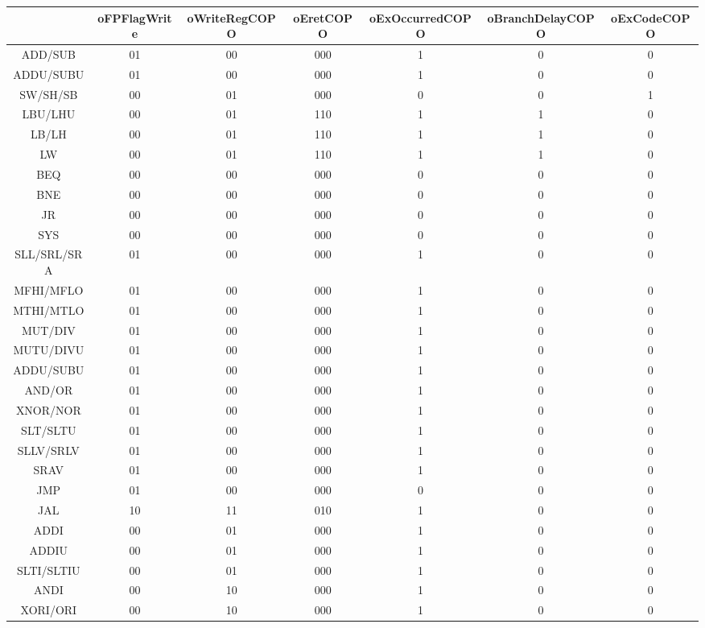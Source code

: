 \documentclass[12pt]{article}
\begin{document}
\begin{longtable}{|c|c|c|c|c|c|c|}
		\hline
		& oFPFlagWrite & oWriteRegCOPO & oEretCOPO & oExOccurredCOPO & oBranchDelayCOPO & oExCodeCOPO\\\hline
		ADD/SUB & 01 & 00 & 000 & 1 & 0 & 0\\\hline	
		ADDU/SUBU & 01 & 00 & 000 & 1 & 0 & 0\\\hline
		SW/SH/SB & 00 & 01 & 000 & 0 & 0 & 1\\\hline
		LBU/LHU & 00 & 01 & 110 & 1 & 1 & 0\\\hline
		LB/LH & 00 & 01 & 110 & 1 & 1 & 0\\\hline
		LW & 00 & 01 & 110 & 1 & 1 & 0\\\hline
		BEQ & 00 & 00 & 000 & 0 & 0 & 0\\\hline	
		BNE & 00 & 00 & 000 & 0 & 0 & 0\\\hline
		JR & 00 & 00 & 000 & 0 & 0 & 0\\\hline
		SYS & 00 & 00 & 000 & 0 & 0 & 0\\\hline
		SLL/SRL/SRA & 01 & 00 & 000 & 1 & 0 & 0\\\hline
		MFHI/MFLO & 01 & 00 & 000 & 1 & 0 & 0\\\hline
		MTHI/MTLO & 01 & 00 & 000 & 1 & 0 & 0\\\hline
		MUT/DIV & 01 & 00 & 000 & 1 & 0 & 0\\\hline
		MUTU/DIVU & 01 & 00 & 000 & 1 & 0 & 0\\\hline
		ADDU/SUBU & 01 & 00 & 000 & 1 & 0 & 0\\\hline
		AND/OR & 01 & 00 & 000 & 1 & 0 & 0\\\hline
		XNOR/NOR & 01 & 00 & 000 & 1 & 0 & 0\\\hline
		SLT/SLTU & 01 & 00 & 000 & 1 & 0 & 0\\\hline
		SLLV/SRLV & 01 & 00 & 000 & 1 & 0 & 0\\\hline
		SRAV & 01 & 00 & 000 & 1 & 0 & 0\\\hline	
		JMP & 01 & 00 & 000 & 0 & 0 & 0\\\hline
		JAL & 10 & 11 & 010 & 1 & 0 & 0\\\hline
		ADDI & 00 & 01 & 000 & 1 & 0 & 0\\\hline
		ADDIU & 00 & 01 & 000 & 1 & 0 & 0\\\hline
		SLTI/SLTIU & 00 & 01 & 000 & 1 & 0 & 0\\\hline
		ANDI & 00 & 10 & 000 & 1 & 0 & 0\\\hline
		XORI/ORI & 00 & 10 & 000 & 1 & 0 & 0\\\hline

\end{longtable}
\end{document}
